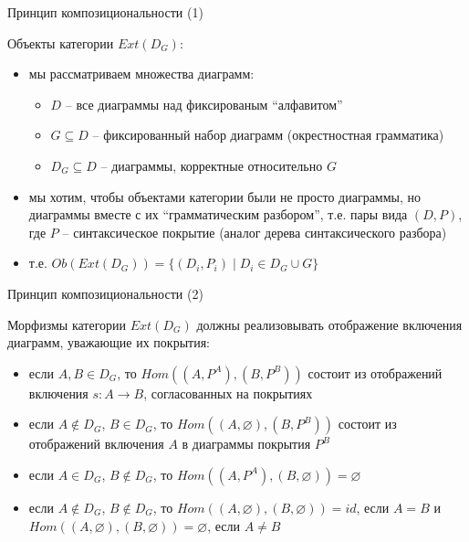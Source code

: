 \documentclass{beamer}
\begin{document}
\begin{frame}{Принцип композициональности (1)}
\begin{small}
Объекты категории $Ext(D_G)$:\\
\medskip
\begin{itemize}
	\item мы рассматриваем множества диаграмм:
		\begin{itemize}
			\item $D$ -- все диаграммы над фиксированым ``алфавитом''
			\item $G \subseteq D$ -- фиксированный набор диаграмм (окрестностная грамматика)
			\item $D_G \subseteq D$ -- диаграммы, корректные относительно $G$
		\end{itemize}
	\item мы хотим, чтобы объектами категории были не просто диаграммы, но диаграммы вместе с их ``грамматическим разбором'', т.е. пары вида $(D, P)$, где $P$ -- синтаксическое покрытие (аналог дерева синтаксического разбора)
	\item т.е. $Ob(Ext(D_G)) = \{ (D_i, P_i) \; \vert \; D_i \in D_G \cup G \}$
\end{itemize}
\end{small}
\end{frame}

\begin{frame}{Принцип композициональности (2)}
\begin{small}
Морфизмы категории $Ext(D_G)$ должны реализовывать отображение включения диаграмм, уважающие их покрытия:\\
\medskip
\begin{itemize}
	\item если $A, B \in D_G$, то $Hom((A, P^A), (B, P^B))$ состоит из отображений включения $s : A \to B$, согласованных на покрытиях
	\item если $A \notin D_G$, $B \in D_G$, то $Hom((A, \varnothing), (B, P^B))$ состоит из отображений включения $A$ в диаграммы покрытия $P^B$
	\item если $A \in D_G$, $B \notin D_G$, то $Hom((A, P^A), (B, \varnothing)) = \varnothing$
	\item если $A \notin D_G$, $B \notin D_G$, то $Hom((A, \varnothing), (B, \varnothing)) = id$, если $A = B$ и $Hom((A, \varnothing), (B, \varnothing)) = \varnothing$, если $A \neq B$
\end{itemize}
\end{small}
\end{frame}
\end{document}
